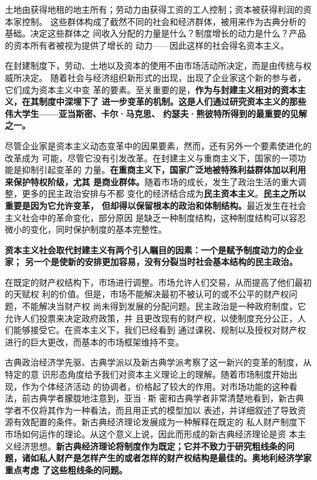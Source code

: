 土地由获得地租的地主所有；劳动力由获得工资的工人控制；资本被获得利润的资本家控制。
这些群体构成了截然不同的社会和经济群体，被用来作为古典分析的基础。决定这些群体之
间收入分配的力量是什么？制度增长的动力是什么？产品的资本所有者被视为提供了增长的
动力——因此这样的社会得名资本主义。

在封建制度下，劳动、土地以及资本的使用不由市场活动所决定，而是由传统与权威所决定。
随着社会与经济组织新形式的出现，出现了企业家这个新的参与者，它们成为资本主义中变
革的要素。至关重要的是，\textbf{作为与封建主义相对的资本主义，在其制度中深埋下了
进一步变革的机制。这是人们通过研究资本主义的那些伟大学生——亚当斯密、卡尔·马克思、
约瑟夫·熊彼特所得到的最重要的见解之一。}

尽管企业家是资本主义动态变革中的因果要素，然而，还有另外一个要素使进化的改革成为
可能，尽管它没有引发改革。在封建主义与重商主义下，国家的一项功能是抑制引起变革的
力量。\textbf{在重商主义下，国家广泛地被特殊利益群体加以利用来保护特权阶级，尤其
是商业群体。}随着市场的成长，发生了政治生活的重大调整，更多的民主政治安排与不都
变化的经济结合成为\textbf{民主资本主义}。\textbf{民主之所以重要是因为它允许变革，
但却得以保留根本的政治和体制结构。}最近发生在社会主义社会中的革命变化，部分原因
是缺乏一种制度结构，这种制度结构可以容忍微小的变化，同时保护制度的基本完整性。

\textbf{资本主义社会取代封建主义有两个引人瞩目的因素：一个是赋予制度动力的企业家；
另一个是使新的安排更加容易，没有分裂当时社会基本结构的民主政治。}

在既定的财产权结构下，市场进行调整。市场允许人们交易，从而提高了他们最初的天赋权
利的价值。但是，市场不能解决最初不被认可的或不公平的财产权问题，不能解决当财产权
尚未得到发展的分配问题。民主政治是一种政府制度，它允许人们投票来决定政府政策，并
且更改现有的财产权，以使制度充分公正，人们能够接受它。在资本主义下，我们已经看到
通过课税、规制以及授权对财产权进行的巨大更改，而基本的市场框架维持不变。

古典政治经济学先驱、古典学派以及新古典学派考察了这一新兴的变革的制度，从特定的意
识形态角度给予我们对资本主义理论上的理解。随着市场制度开始出现，作为个体经济活动
的协调者，价格起了较大的作用。对市场功能的这种看法，前古典学者朦胧地注意到，亚当·斯
密和古典学者非常清楚地看到，新古典学者不仅将其作为一种看法，而且用正式的模型加以
表述，并详细叙述了导致资源有效配置的条件。新古典经济理论发展成为一种解释在既定的
私人财产制度下市场如何运作的理论。从这个意义上说，因此而形成的新古典经济理论是资
本主义经济思想。\textbf{新古典经济理论将制度作为既定；它并不致力于研究粗线条的问
题，诸如私人财产是怎样产生的或者怎样的财产权结构是最佳的。奥地利经济学家重点考虑
了这些粗线条的问题。}

